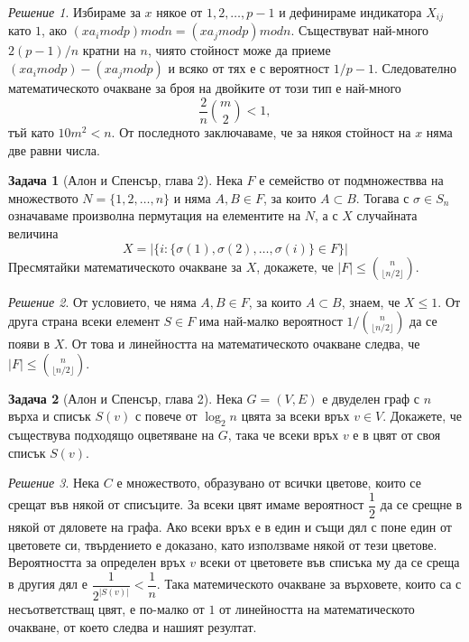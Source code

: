 \documentclass[11 pt, a4paper]{article}
\theoremstyle{definition}
\newtheorem{p}{Задача}
\theoremstyle{remark}
\newtheorem*{s}{Решение}
\begin{document}
\begin{s}
Избираме за $x$ някое от $1,2,\dots,p-1$ и дефинираме индикатора $X_{ij}$ като $1$, ако $(x a_i mod p) mod n=(x a_j mod p) mod n$. Съществуват най-много $2(p-1)/n$ кратни на $n$, чиято стойност може да приеме $(x a_i mod p)-(x a_j mod p)$ и всяко от тях е с вероятност $1/p-1$. Следователно математическото очакване за броя на двойките от този тип е най-много
\begin{equation*}
\dfrac{2}{n}{{m}\choose{2}}<1,
\end{equation*}
тъй като $10m^2<n$. От последното заключаваме, че за някоя стойност на $x$ няма две равни числа.
\end{s}
\begin{p}[Алон и Спенсър, глава 2]
Нека $F$ е семейство от подмножествва на множеството $N=\big\{1,2,\dots,n\big\}$ и няма $A,B\in F$, за които $A\subset B$. Тогава с $\sigma\in S_n $ означаваме произволна пермутация на елементите на $N$, а с $X$ случайната величина
\begin{equation*}
X=|\big\{i:\big\{\sigma(1), \sigma(2), \dots, \sigma(i)\big\} \in F\big\}|
\end{equation*}
Пресмятайки математическото очакване за $X$, докажете, че $|F|\leq{{n}\choose{\lfloor{n/2}\rfloor}}$.
\end{p}
\begin{s}
От условието, че няма $A,B\in F$, за които $A\subset B$, знаем, че $X\leq1$. От друга страна всеки елемент $S\in F$ има най-малко вероятност $1/{{n}\choose{\lfloor{n/2}\rfloor}}$ да се появи в $X$. От това и линейността на математическото очакване следва, че $|F|\leq{{n}\choose{\lfloor{n/2}\rfloor}}$.
\end{s}

\begin{p}[Алон и Спенсър, глава 2]
Нека $G=(V,E)$ е двуделен граф с $n$ върха и списък $S(v)$ с повече от $\log_{2}{n}$ цвята за всеки връх $v\in V$. Докажете, че съществува подходящо оцветяване на $G$, така че всеки връх $v$ е в цвят от своя списък $S(v)$. 
\end{p}
\begin{s}
Нека $C$ е множеството, образувано от всички цветове, които се срещат във някой от списъците. За всеки цвят имаме вероятност $\dfrac{1}{2}$ да се срещне в някой от дяловете на графа. Ако всеки връх е в един и същи дял с поне един от цветовете си, твърдението е доказано, като използваме някой от тези цветове. Вероятността за определен връх $v$ всеки от цветовете във списъка му да се среща в другия дял е $\dfrac{1}{2^{|S(v)|}}<\dfrac{1}{n}$. Така матемическото очакване за върховете, които са с несъответстващ цвят, е по-малко от $1$ от линейността на математическото очакване, от което следва и нашият резултат. 
\end{s}
\end{document}
